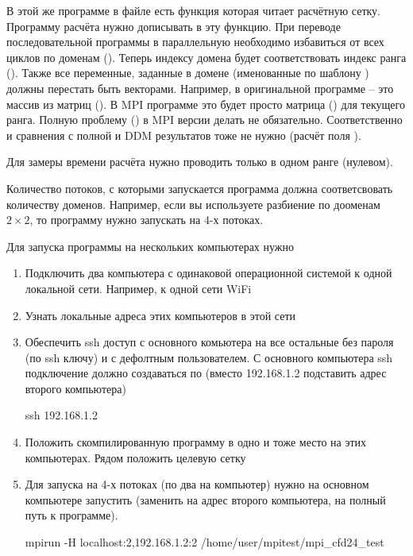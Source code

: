 В этой же программе в файле  есть функция 
которая читает расчётную сетку. Программу расчёта нужно дописывать в эту функцию.
При переводе последовательной программы в параллельную необходимо
избавиться от всех циклов по доменам (). Теперь индексу домена будет соответствовать индекс ранга ().
Также все переменные, заданные в домене (именованные по шаблону )
должны перестать быть векторами. Например,  в оригинальной программе -- это массив из матриц ().
В MPI программе это будет просто матрица () для текущего ранга.
Полную проблему () в MPI версии делать не обязательно.
Соответственно и сравнения с полной и DDM результатов тоже не нужно (расчёт поля ).

Для замеры времени расчёта нужно проводить только в одном ранге (нулевом).

Количество потоков, с которыми запускается программа должна соответсвовать количеству доменов.
Например, если вы используете разбиение по дооменам $2\times2$, то программу нужно запускать на 4-х потоках.

Для запуска программы на нескольких компьютерах нужно
\begin{enumerate}
\item Подключить два компьютера с одинаковой операционной системой к одной локальной сети. Например, к одной сети WiFi
\item Узнать локальные адреса этих компьютеров в этой сети
\item Обеспечить ssh доступ с основного комьютера на все остальные без пароля (по ssh ключу) и с дефолтным пользователем.
      С основного компьютера ssh подключение должно создаваться по (вместо 192.168.1.2 подставить адрес второго компьютера)
      \begin{cppcode}
      ssh 192.168.1.2
      \end{cppcode}
\item Положить скомпилированную программу  в одно и тоже место на этих компьютерах. Рядом положить целевую сетку
\item Для запуска на 4-х потоках (по два на компьютер) нужно на основном компьютере запустить (заменить  на адрес второго компьютера,  на полный путь к программе).
      \begin{cppcode}
      mpirun -H localhost:2,192.168.1.2:2 /home/user/mpitest/mpi_cfd24_test
      \end{cppcode}
\end{enumerate}
